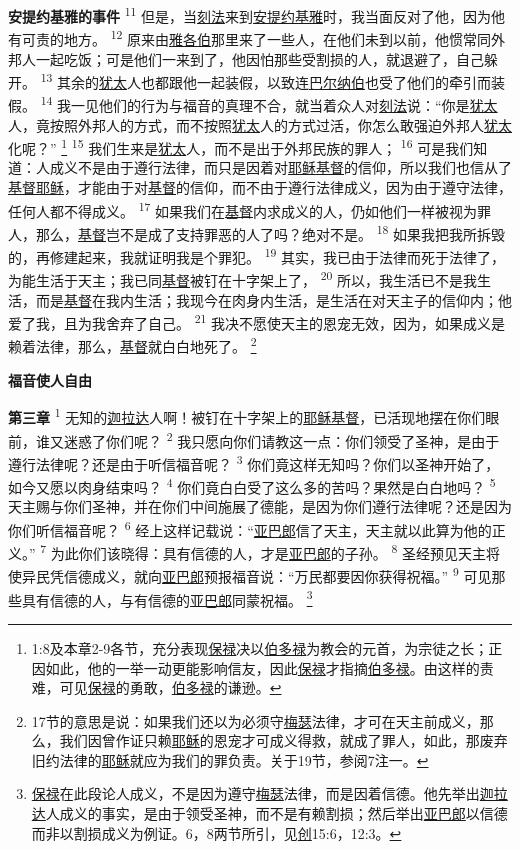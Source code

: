 \textbf{安提约基雅的事件\quad}
\textsuperscript{11}
但是，当\uline{刻法}来到\uline{安提约基}\uline{雅}时，我当面反对了他，因为他有可责的地方。
\textsuperscript{12}
原来由\uline{雅各伯}那里来了一些人，在他们未到以前，他惯常同外邦人一起吃饭；可是他们一来到了，他因怕那些受割损的人，就退避了，自己躲开。
\textsuperscript{13}
其余的\uline{犹太}人也都跟他一起装假，以致连\uline{巴尔纳伯}也受了他们的牵引而装假。
\textsuperscript{14}
我一见他们的行为与福音的真理不合，就当着众人对\uline{刻法}说：“你是\uline{犹太}人，竟按照外邦人的方式，而不按照\uline{犹太}人的方式过活，你怎么敢强迫外邦人\uline{犹太}化呢？”
\footnote{1:8及本章2-9各节，充分表现\uline{保禄}决以\uline{伯多禄}为教会的元首，为宗徒之长；正因如此，他的一举一动更能影响信友，因此\uline{保禄}才指摘\uline{伯多禄}。由这样的责难，可见\uline{保禄}的勇敢，\uline{伯多禄}的谦逊。}
\textsuperscript{15}
我们生来是\uline{犹太}人，而不是出于外邦民族的罪人；
\textsuperscript{16}
可是我们知道：人成义不是由于遵行法律，而只是因着对\uline{耶稣}\uline{基督}的信仰，所以我们也信从了\uline{基督}\uline{耶稣}，才能由于对\uline{基督}的信仰，而不由于遵行法律成义，因为由于遵守法律，任何人都不得成义。
\textsuperscript{17}
如果我们在\uline{基督}内求成义的人，仍如他们一样被视为罪人，那么，\uline{基督}岂不是成了支持罪恶的人了吗？绝对不是。
\textsuperscript{18}
如果我把我所拆毁的，再修建起来，我就证明我是个罪犯。
\textsuperscript{19}
其实，我已由于法律而死于法律了，为能生活于天主；我已同\uline{基督}被钉在十字架上了，
\textsuperscript{20}
所以，我生活已不是我生活，而是\uline{基督}在我内生活；我现今在肉身内生活，是生活在对天主子的信仰内；他爱了我，且为我舍弃了自己。
\textsuperscript{21}
我决不愿使天主的恩宠无效，因为，如果成义是赖着法律，那么，\uline{基督}就白白地死了。
\footnote{17节的意思是说：如果我们还以为必须守\uline{梅瑟}法律，才可在天主前成义，那么，我们因曾作证只赖\uline{耶稣}的恩宠才可成义得救，就成了罪人，如此，那废弃旧约法律的\uline{耶稣}就应为我们的罪负责。关于19节，参阅7注一。}

\begin{center}
	\textbf{\large{\songti 福音使人自由}}
\end{center}

\textbf{第三章\quad}
\textsuperscript{1}
无知的\uline{迦拉达}人啊！被钉在十字架上的\uline{耶稣}\uline{基督}，已活现地摆在你们眼前，谁又迷惑了你们呢？
\textsuperscript{2}
我只愿向你们请教这一点：你们领受了圣神，是由于遵行法律呢？还是由于听信福音呢？
\textsuperscript{3}
你们竟这样无知吗？你们以圣神开始了，如今又愿以肉身结束吗？
\textsuperscript{4}
你们竟白白受了这么多的苦吗？果然是白白地吗？
\textsuperscript{5}
天主赐与你们圣神，并在你们中间施展了德能，是因为你们遵行法律呢？还是因为你们听信福音呢？
\textsuperscript{6}
经上这样记载说：“\uline{亚巴郎}信了天主，天主就以此算为他的正义。”
\textsuperscript{7}
为此你们该晓得：具有信德的人，才是\uline{亚巴郎}的子孙。
\textsuperscript{8}
圣经预见天主将使异民凭信德成义，就向\uline{亚巴郎}预报福音说：“万民都要因你获得祝福。”
\textsuperscript{9}
可见那些具有信德的人，与有信德的\uline{亚巴郎}同蒙祝福。
\footnote{\uline{保禄}在此段论人成义，不是因为遵守\uline{梅瑟}法律，而是因着信德。他先举出\uline{迦拉达}人成义的事实，是由于领受圣神，而不是有赖割损；然后举出\uline{亚巴郎}以信德而非以割损成义为例证。6，8两节所引，见\uline{创}15:6，12:3。}

